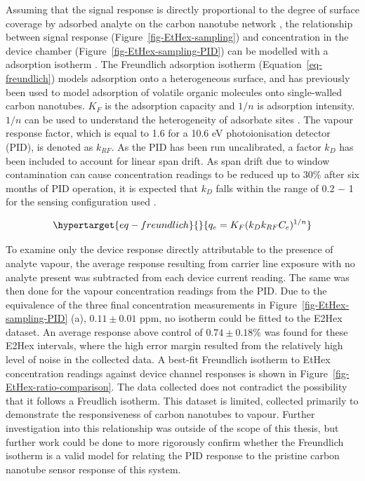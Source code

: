 \documentclass[
  a4paper,
]{scrbook}
\begin{document}
Assuming that the signal response is directly proportional to the degree
of surface coverage by adsorbed analyte on the carbon nanotube network
\autocite{Lee2005}, the relationship between signal response
(Figure~\ref{fig-EtHex-sampling}) and concentration in the device
chamber (Figure~\ref{fig-EtHex-sampling-PID}) can be modelled with a
adsorption isotherm \autocite{Agnihotri2005}. The Freundlich adsorption
isotherm (Equation~\ref{eq-freundlich}) models adsorption onto a
heterogeneous surface, and has previously been used to model adsorption
of volatile organic molecules onto single-walled carbon nanotubes.
\(K_F\) is the adsorption capacity and \(1/n\) is adsorption intensity.
\(1/n\) can be used to understand the heterogeneity of adsorbate sites
\autocite{Ayawei2017,Sabzehmeidani2021}. The vapour response factor,
which is equal to 1.6 for a 10.6 eV photoionisation detector (PID), is
denoted as \(k_{RF}\). As the PID has been run uncalibrated, a factor
\(k_{D}\) has been included to account for linear span drift. As span
drift due to window contamination can cause concentration readings to be
reduced up to 30\% after six months of PID operation, it is expected
that \(k_{D}\) falls within the range of 0.2 \(-\) 1 for the sensing
configuration used \autocite{PIDmanual,Ionscience}.

\begin{equation}\protect\hypertarget{eq-freundlich}{}{
q_e = K_F(k_Dk_{RF}C_e)^{1/n}
}\label{eq-freundlich}\end{equation}

To examine only the device response directly attributable to the
presence of analyte vapour, the average response resulting from carrier
line exposure with no analyte present was subtracted from each device
current reading. The same was then done for the vapour concentration
readings from the PID. Due to the equivalence of the three final
concentration measurements in Figure~\ref{fig-EtHex-sampling-PID} (a),
\(0.11\pm0.01\) ppm, no isotherm could be fitted to the E2Hex dataset.
An average response above control of \(0.74\pm0.18\)\% was found for
these E2Hex intervals, where the high error margin resulted from the
relatively high level of noise in the collected data. A best-fit
Freundlich isotherm to EtHex concentration readings against device
channel responses is shown in Figure~\ref{fig-EtHex-ratio-comparison}.
The data collected does not contradict the possibility that it follows a
Freudlich isotherm. This dataset is limited, collected primarily to
demonstrate the responsiveness of carbon nanotubes to vapour. Further
investigation into this relationship was outside of the scope of this
thesis, but further work could be done to more rigorously confirm
whether the Freundlich isotherm is a valid model for relating the PID
response to the pristine carbon nanotube sensor response of this system.
\end{document}
